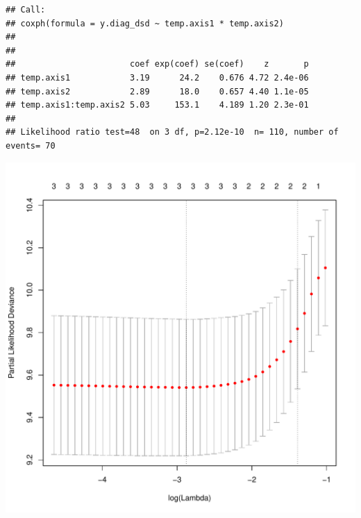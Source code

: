 \documentclass{article}
\begin{document}
\begin{knitrout}
\begin{kframe}\begin{alltt}
 \hlopt{~}  \hlopt{*} 
\end{alltt}
\begin{verbatim}
## Call:
## coxph(formula = y.diag_dsd ~ temp.axis1 * temp.axis2)
## 
## 
##                       coef exp(coef) se(coef)    z       p
## temp.axis1            3.19      24.2    0.676 4.72 2.4e-06
## temp.axis2            2.89      18.0    0.657 4.40 1.1e-05
## temp.axis1:temp.axis2 5.03     153.1    4.189 1.20 2.3e-01
## 
## Likelihood ratio test=48  on 3 df, p=2.12e-10  n= 110, number of events= 70
\end{verbatim}
\begin{alltt}
 \hlkwb{=} \hlstd{(}\hlopt{*}  \hlstd{=} \hlstd{,}  \hlstd{=} \hlstd{)}
\end{alltt}
\end{kframe}

{\centering \includegraphics[width=\maxwidth]{figure/metagene-pairs-11} 

}



\end{knitrout}
\end{document}
